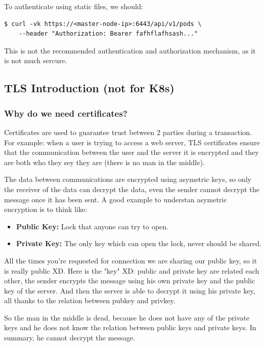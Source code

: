\documentclass{article}
\newenvironment{blocktemplateIII}[1]{%
    \tcolorbox[beamer,%
    noparskip,breakable,
    ,colframe=Red,%
    colbacklower=LimeGreen!75!LightGreen,%
    title=#1]}%
    {\endtcolorbox}
\newenvironment{codetemplate}[1][]{%
  \mybasecolorbox[#1]
  \itshape
}{%
  \endmybasecolorbox
}
\begin{document}
To authenticate using static files, we should:
\begin{codetemplate}{}
\begin{verbatim}
$ curl -vk https://<master-node-ip>:6443/api/v1/pods \
    --header "Authorization: Bearer fafhflafhsash..."
\end{verbatim}
\end{codetemplate}

\begin{blocktemplateIII}{WARNING}
This is not the recommended authentication and authorization mechanism, as it is not much sercure.
\end{blocktemplateIII}

\subsection{TLS Introduction (not for K8s)}

\subsubsection{Why do we need certificates?}
Certificates are used to guarantee trust between 2 parties during a transaction. For example: when a user is trying to access a web server, TLS certificates ensure that the communication between the user and the server it is encrypted and they are both who they sey they are (there is no man in the middle).

The data between communications are encrypted using asymetric keys, so only the receiver of the data can decrypt the data, even the sender cannot decrypt the message once it has been sent. A good example to understan asymetric encryption is to think like:
\begin{itemize}
    \item \textbf{Public Key:} Lock that anyone can try to open.
    \item \textbf{Private Key:} The only key which can open the lock, never should be shared.
\end{itemize}

All the times you're requested for connection we are sharing our public key, 
so it is really public XD. Here is the "key" XD: public and private key are related each other,
the sender encrypts the message using his own private key and the public key of the server. And then the server is able to
decrypt it using his private key, all thanks to the relation between pubkey and privkey. 

So the man in the middle is dead, because he does not have any of the private keys and he does not know the relation between public keys and private keys. In summary, he cannot decrypt the message.
\end{document}
